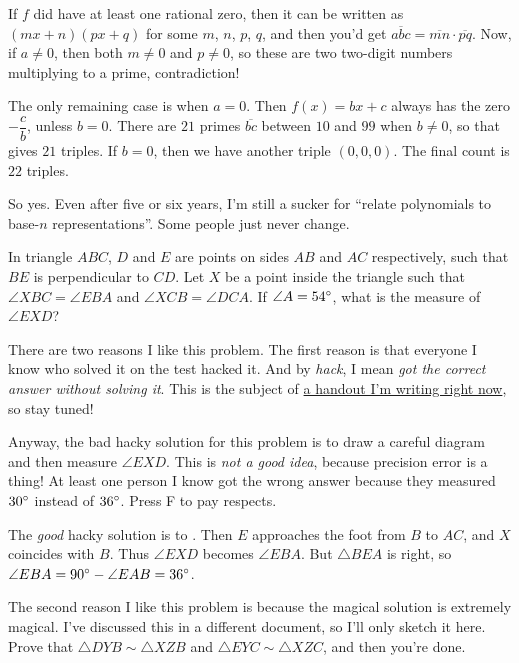 \documentclass[11pt,paper=letter]{scrartcl}
\begin{document}
If $f$ did have at least one rational zero, then it can be written as $(mx + n)(px + q)$ for some $m$, $n$, $p$, $q$, and then you'd get $\overline{abc} = \overline{mn} \cdot \overline{pq}$. Now, if $a \neq 0$, then both $m \neq 0$ and $p \neq 0$, so these are two two-digit numbers multiplying to a prime, contradiction!

The only remaining case is when $a = 0$. Then $f(x) = bx + c$ always has the zero $-\dfrac cb$, unless $b = 0$. There are $21$ primes $\overline{bc}$ between $10$ and $99$ when $b \neq 0$, so that gives $21$ triples. If $b = 0$, then we have another triple $(0, 0, 0)$. The final count is $22$ triples.

So yes. Even after five or six years, I'm still a sucker for ``relate polynomials to base-$n$ representations''. Some people just never change.

\begin{probboxed}
   In triangle $ABC$, $D$ and $E$ are points on sides $AB$ and $AC$ respectively, such that $BE$ is perpendicular to $CD$. Let $X$ be a point inside the triangle such that $\angle XBC = \angle EBA$ and $\angle XCB = \angle DCA$. If $\angle A = 54^\circ$, what is the measure of $\angle EXD$?
\end{probboxed}

There are two reasons I like this problem. The first reason is that everyone I know who solved it on the test hacked it. And by \emph{hack}, I mean \emph{got the correct answer without solving it}. This is the subject of \href{https://cjquines.com/files/drafts/hacking.pdf}{a handout I'm writing right now}, so stay tuned! 

Anyway, the bad hacky solution for this problem is to draw a careful diagram and then measure $\angle EXD$. This is \emph{not a good idea}, because precision error is a thing! At least one person I know got the wrong answer because they measured $30^\circ$ instead of $36^\circ$. Press F to pay respects.

The \emph{good} hacky solution is to . Then $E$ approaches the foot from $B$ to $AC$, and $X$ coincides with $B$. Thus $\angle EXD$ becomes $\angle EBA$. But $\triangle BEA$ is right, so $\angle EBA = 90^\circ - \angle EAB = 36^\circ$. 

The second reason I like this problem is because the magical solution is extremely magical. I've discussed this in a different document, so I'll only sketch it here.  Prove that $\triangle DYB \sim \triangle XZB$ and $\triangle EYC \sim \triangle XZC$, and then you're done. 
\end{document}
